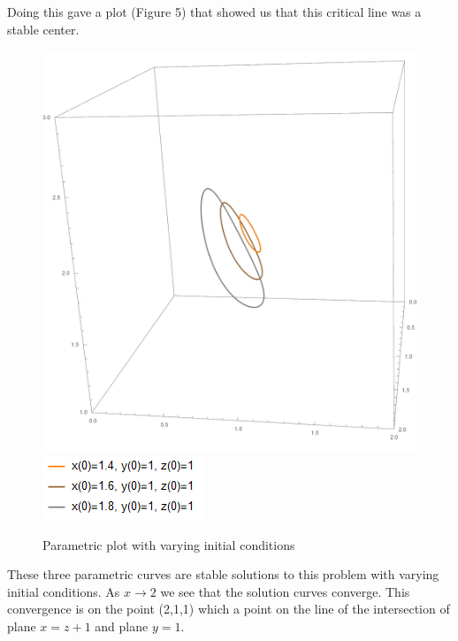 \documentclass[11pt,oneside]{article}
\begin{document}
	Doing this gave a plot (Figure 5) that showed us that this critical line was a stable center.
	\begin{figure}[H]
		\center
		\includegraphics[scale=0.40]{3Parametric}
		\includegraphics[scale=0.75]{Legend}
		\caption{Parametric plot with varying initial conditions}
	\end{figure}
	
	These three parametric curves are stable solutions to this problem with varying initial conditions. As $x \rightarrow 2$ we see that the solution curves converge. This convergence is on the point (2,1,1) which a point on the line of the intersection of plane $x=z+1$ and plane $y=1$. 
	
\end{document}
